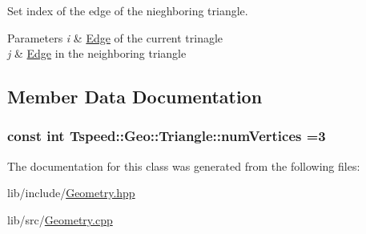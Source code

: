 Set index of the edge of the nieghboring triangle. 


\begin{DoxyParams}{Parameters}
{\em i} & \hyperlink{classTspeed_1_1Geo_1_1Edge}{Edge} of the current trinagle \\
\hline
{\em j} & \hyperlink{classTspeed_1_1Geo_1_1Edge}{Edge} in the neighboring triangle \\
\hline
\end{DoxyParams}


\subsection{Member Data Documentation}
\hypertarget{classTspeed_1_1Geo_1_1Triangle_af01040fae660e384b7919ed166ed88ae}{
\subsubsection[{num\-Vertices}]{\setlength{\rightskip}{0pt plus 5cm}const int Tspeed\-::\-Geo\-::\-Triangle\-::num\-Vertices =3\hspace{0.3cm}{\ttfamily [static]}}}\label{classTspeed_1_1Geo_1_1Triangle_af01040fae660e384b7919ed166ed88ae}


The documentation for this class was generated from the following files\-:\begin{DoxyCompactItemize}
\item 
lib/include/\hyperlink{Geometry_8hpp}{Geometry.\-hpp}\item 
lib/src/\hyperlink{Geometry_8cpp}{Geometry.\-cpp}\end{DoxyCompactItemize}
